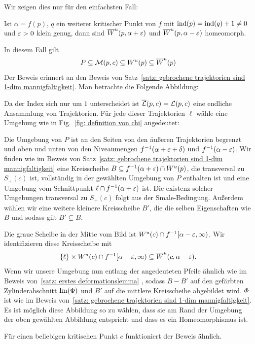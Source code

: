 \begin{bigproof}
   Wir zeigen dies nur für den einfachsten Fall:

    \begin{claim}
        Ist $\alpha = f(p)$, $q$ ein weiterer kritischer Punkt von $f$ mit 
        ${ \operatorname{ind} } (p) = { \operatorname{ind} } (q) + 1 \neq 0$ und $\varepsilon > 0$ klein genug, dann sind 
        ${ \overline{W}^u } (p, \alpha + \varepsilon)$ und ${ \overline{W}^u } (p, \alpha - \varepsilon)$ homeomorph.
    \end{claim}

    \begin{smallproof}
        In diesem Fall gilt 
        \[ P \subseteq \mathcal{M} (p, c) \subseteq { W^u } (p) \subseteq { \overline{W}^u } (p) \]
        Der Beweis erinnert an den Beweis von Satz~\ref{satz: gebrochene trajektorien sind 1-dim mannigfaltigkeit}.
        Man betrachte die Folgende Abbildung:

        Da der Index sich nur um $1$ unterscheidet ist ${\overline{\mathcal{L}} } (p, c) = { \mathcal{L} } (p, c)$ eine endliche Ansammlung 
        von Trajektorien. Für jede dieser Trajektorien $\ell$ wähle eine Umgebung wie in 
        Fig.~\ref{fig: definition von chi} angedeutet:

        Die Umgebung von $P$ ist an den Seiten von den äußeren Trajektorien begrenzt und oben und unten von den
        Niveaumengen $f^{-1}(\alpha + \varepsilon + \delta)$ und $f^{-1}(\alpha - \varepsilon)$. Wir finden wie im Beweis 
        von Satz~\ref{satz: gebrochene trajektorien sind 1-dim mannigfaltigkeit} eine Kreisscheibe 
        $B \subseteq f^{-1}(\alpha + \varepsilon) \cap { W^u } (p)$, die transversal zu $S_+(c)$ ist, vollständig in der 
        gewählten Umgebung von $P$ enthalten ist und eine Umgebung vom Schnittpunkt 
        $\ell \cap f^{-1}(\alpha + \varepsilon)$ ist. Die existenz solcher Umgebungen transversal zu $S_+(c)$ folgt 
        aus der Smale-Bedingung. Außerdem wählen wir eine weitere kleinere Kreisscheibe $B'$, 
        die die selben Eigenschaften wie $B$ und sodass gilt $B' \subsetneq B$. 

        Die graue Scheibe in der Mitte vom Bild ist ${ W^u } (c) \cap f^{-1} [\alpha - \varepsilon, \infty)$. 
        Wir identifizieren diese Kreisscheibe mit 
        \[ \{ \ell \} \times { W^u } (c) \cap f^{-1} [\alpha - \varepsilon, \infty) \subseteq 
            { \overline{W}^u } (c, \alpha - \varepsilon) . \]
        Wenn wir unsere Umgebung nun entlang der angedeuteten Pfeile ähnlich wie im Beweis 
        von~\ref{satz: erstes deformationslemma} , sodass 
        $B - B'$ auf den gefärbten Zylinderabschnitt ${ \operatorname{Im} } (\Phi)$ und $B'$ auf die mittlere Kreisscheibe 
        abgebildet wird. $\Phi$ ist wie im Beweis 
        von~\ref{satz: gebrochene trajektorien sind 1-dim mannigfaltigkeit}. 
        Es ist möglich diese Abbildung so zu wählen, dass sie am Rand der Umgebung der 
        oben gewählten Abbildung entspricht und dass es ein Homeomorphismus ist.
    \end{smallproof}

    Für einen beliebigen kritischen Punkt $c$ funktioniert der Beweis ähnlich.
\end{bigproof}

